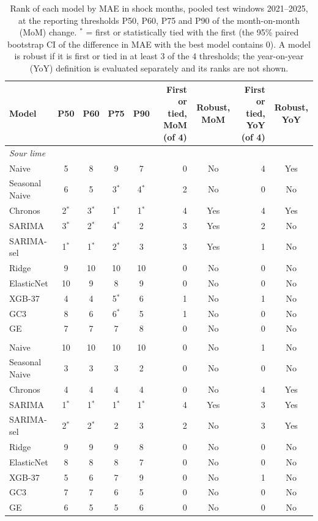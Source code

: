 \begin{table}[htbp]
\centering
\small
\caption{Rank of each model by MAE in shock months, pooled test windows 2021--2025, at the reporting thresholds P50, P60, P75 and P90 of the month-on-month (MoM) change. $^{*}$ = first or statistically tied with the first (the 95\% paired bootstrap CI of the difference in MAE with the best model contains 0). A model is robust if it is first or tied in at least 3 of the 4 thresholds; the year-on-year (YoY) definition is evaluated separately and its ranks are not shown.}
\label{tab:main_robust_ranking}
\begin{tabular}{lccccrcrc}
\toprule
Model & P50 & P60 & P75 & P90 & First or tied, MoM (of 4) & Robust, MoM & First or tied, YoY (of 4) & Robust, YoY \\
\midrule
\multicolumn{9}{l}{\textit{Sour lime}} \\
Naive & 5 & 8 & 9 & 7 & 0 & No & 4 & Yes \\
Seasonal Naive & 6 & 5 & 3$^{*}$ & 4$^{*}$ & 2 & No & 0 & No \\
Chronos & 2$^{*}$ & 3$^{*}$ & 1$^{*}$ & 1$^{*}$ & 4 & Yes & 4 & Yes \\
SARIMA & 3$^{*}$ & 2$^{*}$ & 4$^{*}$ & 2 & 3 & Yes & 2 & No \\
SARIMA-sel & 1$^{*}$ & 1$^{*}$ & 2$^{*}$ & 3 & 3 & Yes & 1 & No \\
Ridge & 9 & 10 & 10 & 10 & 0 & No & 0 & No \\
ElasticNet & 10 & 9 & 8 & 9 & 0 & No & 0 & No \\
XGB-37 & 4 & 4 & 5$^{*}$ & 6 & 1 & No & 1 & No \\
GC3 & 8 & 6 & 6$^{*}$ & 5 & 1 & No & 0 & No \\
GE & 7 & 7 & 7 & 8 & 0 & No & 0 & No \\
\addlinespace
\multicolumn{9}{l}{\textit{Sweet lime}} \\
Naive & 10 & 10 & 10 & 10 & 0 & No & 1 & No \\
Seasonal Naive & 3 & 3 & 3 & 2 & 0 & No & 0 & No \\
Chronos & 4 & 4 & 4 & 4 & 0 & No & 4 & Yes \\
SARIMA & 1$^{*}$ & 1$^{*}$ & 1$^{*}$ & 1$^{*}$ & 4 & Yes & 3 & Yes \\
SARIMA-sel & 2$^{*}$ & 2$^{*}$ & 2 & 3 & 2 & No & 3 & Yes \\
Ridge & 9 & 9 & 9 & 8 & 0 & No & 0 & No \\
ElasticNet & 8 & 8 & 8 & 7 & 0 & No & 0 & No \\
XGB-37 & 5 & 6 & 7 & 9 & 0 & No & 1 & No \\
GC3 & 7 & 7 & 6 & 5 & 0 & No & 0 & No \\
GE & 6 & 5 & 5 & 6 & 0 & No & 0 & No \\
\bottomrule
\end{tabular}
\end{table}
